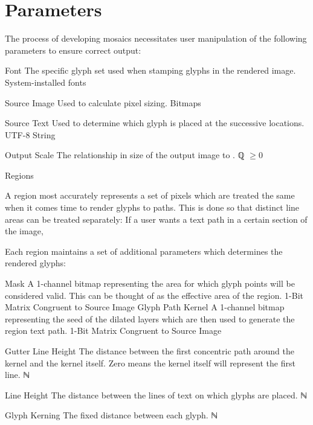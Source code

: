 \section{Parameters}
\label{apx:userparams}
The process of developing mosaics necessitates user manipulation of the following parameters to ensure correct output:
\begin{itemize}
  \paritem
  {Font}
  {The specific glyph set used when stamping glyphs in the rendered image.  }
  {System-installed fonts}
  {\FontParSymbol}

  \paritem
  {Source Image}
  {Used to calculate pixel sizing.}
  {Bitmaps}
  {\SrcImgParSymbol}

  \paritem
  {Source Text}
  {Used to determine which glyph is placed at the successive locations.}
  {UTF-8 String}
  {\SrcTxtParSymbol}

  \paritem
  {Output Scale}
  {The relationship in size of the output image to \SrcImgParSymbol.}
  {ℚ \(\geq 0\)}
  {\OutSclParSymbol}

  \pbodyitem
  {Regions}
  {
    \label{apx:regparams}
    A region most accurately represents a set of pixels which are treated the same when it comes time to render glyphs to paths.
    This is done so that distinct line areas can be treated separately:  If a user wants a text path in a certain section of the image,

    Each region maintains a set of additional parameters which determines the rendered glyphs:
    \begin{itemize}
      \paritem
      {Mask}
      {A 1-channel bitmap representing the area for which glyph points will be considered valid.
        This can be thought of as the effective area of the region.}
      {1-Bit Matrix Congruent to Source Image}
      {\RegMskParSymbol}
      \paritem
      {Glyph Path Kernel}
      {A 1-channel bitmap representing the seed of the dilated layers which are then used to generate the region text path.}
      {1-Bit Matrix Congruent to Source Image}
      {\GlyphPathKernelParSymbol}

      \paritem
      {Gutter Line Height}
      {The distance between the first concentric path around the kernel and the kernel itself.
        Zero means the kernel itself will represent the first line.}
      {ℕ}
      {\GtrHtParSymbol}

      \paritem
      {Line Height}
      {The distance between the lines of text on which glyphs are placed.}
      {ℕ}
      {\LnHtParSymbol}

      \paritem
      {Glyph Kerning}
      {The fixed distance between each glyph.}
      {ℕ}
      {\GlyphKrnParSymbol}


\end{itemize}}
\end{itemize}
